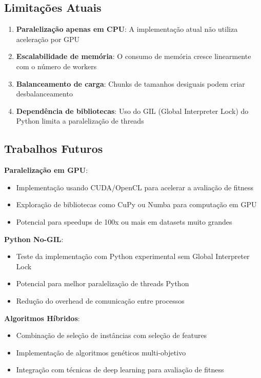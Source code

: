 \documentclass[12pt,a4paper]{article}
\begin{document}
\subsection{Limitações Atuais}

\begin{enumerate}
    \item \textbf{Paralelização apenas em CPU}: A implementação atual não utiliza aceleração por GPU
    \item \textbf{Escalabilidade de memória}: O consumo de memória cresce linearmente com o número de workers
    \item \textbf{Balanceamento de carga}: Chunks de tamanhos desiguais podem criar desbalanceamento
    \item \textbf{Dependência de bibliotecas}: Uso do GIL (Global Interpreter Lock) do Python limita a paralelização de threads
\end{enumerate}

\subsection{Trabalhos Futuros}

\textbf{Paralelização em GPU}:
\begin{itemize}
    \item Implementação usando CUDA/OpenCL para acelerar a avaliação de fitness
    \item Exploração de bibliotecas como CuPy ou Numba para computação em GPU
    \item Potencial para speedups de 100x ou mais em datasets muito grandes
\end{itemize}

\textbf{Python No-GIL}:
\begin{itemize}
    \item Teste da implementação com Python experimental sem Global Interpreter Lock
    \item Potencial para melhor paralelização de threads Python
    \item Redução do overhead de comunicação entre processos
\end{itemize}

\textbf{Algoritmos Híbridos}:
\begin{itemize}
    \item Combinação de seleção de instâncias com seleção de features
    \item Implementação de algoritmos genéticos multi-objetivo
    \item Integração com técnicas de deep learning para avaliação de fitness
\end{itemize}
\end{document}
